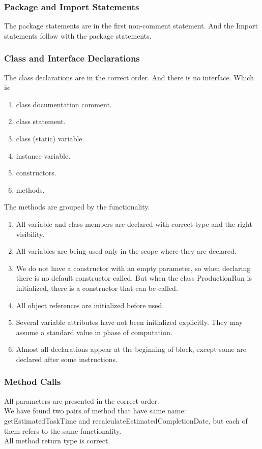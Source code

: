 \documentclass{article}
\begin{document}
  \subsubsection{Package and Import Statements}
  The package statements are in the first non-comment statement.\newline
  And the Import statements follow with the package statements.
  
  \subsubsection{Class and Interface Declarations}
  The class declarations are in the correct order. And there is no interface.\newline
  Which is:\newline
  \begin{enumerate}
  	\item class documentation comment.
  	\item class statement.
  	\item class (static) variable.
  	\item instance variable.
  	\item constructors.
  	\item methods.
  \end{enumerate}
  The methods are grouped by the functionality.\newline
  
\begin{enumerate}
	\item
	All variable and class members are declared with correct type and the right visibility.
	\item
	All variables are being used only in the scope where they are declared.
	\item
	We do not have a constructor with  an empty parameter, so when declaring there is no  default constructor called. But when the class ProductionRun is initialized, there is a constructor that can be called.
	\item
	All object references are initialized before used.
	\item
	Several variable attributes have not been initialized explicitly. They may assume a standard value in phase of computation. 
	\item
	Almost all declarations appear at the beginning of block, except some are declared after some instructions.
\end{enumerate}
\subsubsection{Method Calls}
All parameters are presented in the correct order.\\
We have found two pairs of method that have same name: getEstimatedTaskTime and recalculateEstimatedCompletionDate, but each of them  refers to the same functionality.\\
All method return type is correct.
\end{document}
